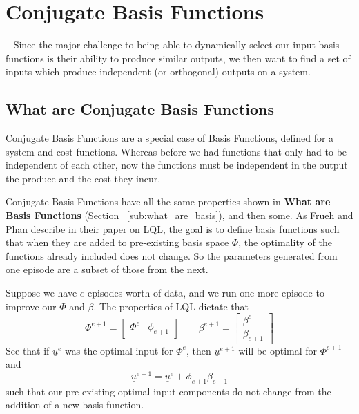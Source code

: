 
\FloatBarrier\section{Conjugate Basis Functions}
~\label{sec:conjugate_basis_functions}
Since the major challenge to being able to dynamically select our input basis functions is their ability to produce similar outputs, we then want to find a set of inputs which produce independent (or orthogonal) outputs on a system. 

\FloatBarrier\subsection{What are Conjugate Basis Functions}
Conjugate Basis Functions are a special case of Basis Functions, defined for a system and cost functions. Whereas before we had functions that only had to be independent of each other, now the functions must be independent in the output the produce and the cost they incur. 

Conjugate Basis Functions have all the same properties shown in \textbf{What are Basis Functions} (Section ~\ref{sub:what_are_basis}), and then some. As Frueh and Phan describe in their paper on \ac{LQL}, the goal is to define basis functions such that when they are added to pre-existing basis space $\Phi$, the optimality of the functions already included does not change. So the parameters generated from one episode are a subset of those from the next.

Suppose we have $e$ episodes worth of data, and we run one more episode to improve our $\Phi$ and $\beta$. The properties of LQL dictate that
\begin{equation}
    \Phi^{e+1} = \begin{bmatrix}
        \Phi^e & \phi_{e+1}
    \end{bmatrix}
    \quad\quad
    \beta^{e+1} = \begin{bmatrix}
        \beta^e \\ \beta_{e+1}
    \end{bmatrix}
    \label{eq:conjugate_subspace}
\end{equation}
See that if $\underline{u}^e$ was the optimal input for $\Phi^e$, then $\underline{u}^{e+1}$ will be optimal for $\Phi^{e+1}$ and
\begin{equation}
    \underline{u}^{e+1} = \underline{u}^e + \phi_{e+1}\beta_{e+1}
\end{equation}
such that our pre-existing optimal input components do not change from the addition of a new basis function. 

